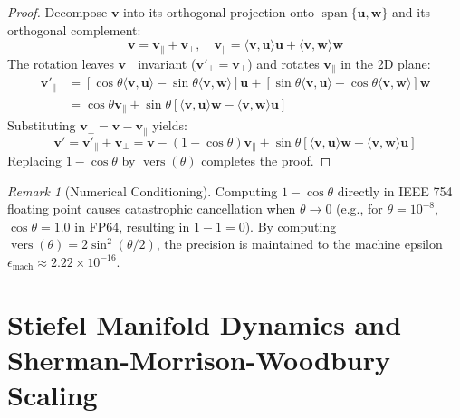 \documentclass[11pt,twoside,a4paper]{article}
\theoremstyle{plain}
\theoremstyle{definition}
\theoremstyle{remark}
\newtheorem{remark}[theorem]{Remark}
\newcommand{\vers}{\operatorname{vers}}
\begin{document}
\begin{proof}
Decompose $\mathbf{v}$ into its orthogonal projection onto $\operatorname{span}\{\mathbf{u}, \mathbf{w}\}$ and its orthogonal complement:
\begin{equation}
\mathbf{v} = \mathbf{v}_{\parallel} + \mathbf{v}_{\perp}, \quad \mathbf{v}_{\parallel} = \langle \mathbf{v}, \mathbf{u} \rangle \mathbf{u} + \langle \mathbf{v}, \mathbf{w} \rangle \mathbf{w}
\end{equation}
The rotation leaves $\mathbf{v}_{\perp}$ invariant ($\mathbf{v}'_{\perp} = \mathbf{v}_{\perp}$) and rotates $\mathbf{v}_{\parallel}$ in the 2D plane:
\begin{align}
\mathbf{v}'_{\parallel} &= [\cos\theta \langle \mathbf{v}, \mathbf{u} \rangle - \sin\theta \langle \mathbf{v}, \mathbf{w} \rangle]\mathbf{u} + [\sin\theta \langle \mathbf{v}, \mathbf{u} \rangle + \cos\theta \langle \mathbf{v}, \mathbf{w} \rangle]\mathbf{w} \\
&= \cos\theta \mathbf{v}_{\parallel} + \sin\theta [\langle \mathbf{v}, \mathbf{u} \rangle \mathbf{w} - \langle \mathbf{v}, \mathbf{w} \rangle \mathbf{u}]
\end{align}
Substituting $\mathbf{v}_{\perp} = \mathbf{v} - \mathbf{v}_{\parallel}$ yields:
\begin{equation}
\mathbf{v}' = \mathbf{v}'_{\parallel} + \mathbf{v}_{\perp} = \mathbf{v} - (1 - \cos\theta)\mathbf{v}_{\parallel} + \sin\theta [\langle \mathbf{v}, \mathbf{u} \rangle \mathbf{w} - \langle \mathbf{v}, \mathbf{w} \rangle \mathbf{u}]
\end{equation}
Replacing $1 - \cos\theta$ by $\vers(\theta)$ completes the proof.
\end{proof}

\begin{remark}[Numerical Conditioning]
Computing $1 - \cos\theta$ directly in IEEE 754 floating point causes catastrophic cancellation when $\theta \to 0$ (e.g., for $\theta = 10^{-8}$, $\cos\theta = 1.0$ in FP64, resulting in $1 - 1 = 0$). By computing $\vers(\theta) = 2\sin^2(\theta/2)$, the precision is maintained to the machine epsilon $\epsilon_{\text{mach}} \approx 2.22 \times 10^{-16}$.
\end{remark}

\section{Stiefel Manifold Dynamics and Sherman-Morrison-Woodbury Scaling}
\end{document}
